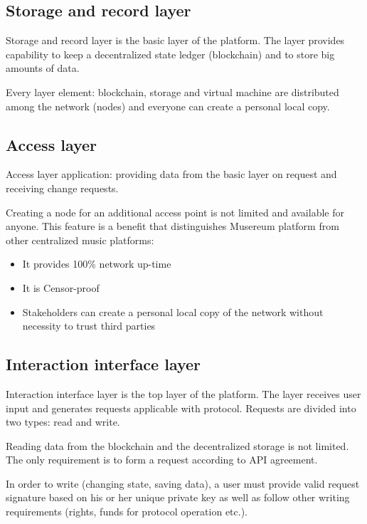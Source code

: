 \documentclass[12pt]{report}
\begin{document}
\subsection{Storage and record layer}
\label{tech-arch-underlayer}
Storage and record layer is the basic layer of the platform. The layer provides capability to keep a decentralized state ledger (blockchain) and to store big amounts of data.

Every layer element: blockchain, storage and virtual machine are distributed among the network (nodes) and everyone can create a personal local copy.
\subsection{Access layer}
\label{tech-arch-connect}
Access layer application: providing data from the basic layer on request and receiving change requests.

Creating a node for an additional access point is not limited and available for anyone. This feature is a benefit that distinguishes Musereum platform from other centralized music platforms:

\begin{itemize}
	\item It provides 100\% network up-time
	\item It is Censor-proof
	\item Stakeholders can create a personal local copy of the network without necessity to trust third parties
\end{itemize}
\subsection{Interaction interface layer}
\label{tech-arch-interfaces}
Interaction interface layer is the top layer of the platform. The layer receives user input and generates requests applicable with protocol. Requests are divided into two types: read and write.

Reading data from the blockchain and the decentralized storage is not limited. The only requirement is to form a request according to API agreement.

In order to write (changing state, saving data), a user must provide valid request signature based on his or her unique private key as well as follow other writing requirements (rights, funds for protocol operation etc.).
\end{document}
